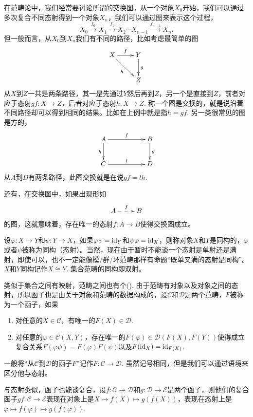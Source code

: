 \para 在范畴论中，我们经常要讨论所谓的交换图。从一个对象$X_0$开始，我们可以通过多次复合不同态射得到一个对象$X_n$，我们可以通过图来表示这个过程，
\[
	X_0\xrightarrow{f_0} X_1\xrightarrow{f_1} X_2\cdots X_{n-1}\xrightarrow{f_{n-1}} X_n.
\]
但一般而言，从$X_0$到$X_n$我们有不同的路径，比如考虑最简单的图
\[
\begin{xy}
	\xymatrix{
		X\ar[r]^{f} \ar[dr]_{h}&Y \ar[d]^{g}\\
		&Z
	}
\end{xy}
\]
从$X$到$Z$一共是两条路径，其一是先通过$Y$然后再到$Z$，另一个是直接到$Z$，前者对应于态射$gf:X\to Z$，后者对应于态射$h:X\to Z$. 称一个图是交换的，就是说沿着不同路径却可以得到相同的结果。比如在上例中就是指$h=gf$. 另一类很常见的图是方的，
\[
\begin{xy}
	\xymatrix{
		A\ar[rr]^{f} \ar[d]_{h}&&B \ar[d]^{g}\\
		C\ar[rr]^{l}&&D
	}
\end{xy}
\]
从$A$到$D$有两条路径，此图交换就是在说$gf=lh$. 

还有，在交换图中，如果出现形如
\[
\begin{xy}
	\xymatrix{
		A\ar@{-->}[r]^{f}&B
	}
\end{xy}
\]
的图，这就意味着，存在唯一的态射$f:A\to B$使得交换图成立。

\para 设$\varphi:X\to Y$和$\psi:Y\to X$，如果$\varphi\psi=\operatorname{id}_Y$和$\psi\varphi=\operatorname{id}_X$，则称对象$X$和$Y$是同构的，$\varphi$或者$\psi$被称为同构（态射）。当然，现在由于暂时不能谈一个态射是单射还是满射，即使可以，也不一定能像模/群/环范畴那样有命题“既单又满的态射是同构”。$X$和$Y$同构记作$X\cong Y$. 集合范畴的同构即双射。

\para 类似于集合之间有映射，范畴之间也有个(). 由于范畴有对象以及对象之间的态射，所以函子也是由关于对象和范畴的数据构成的，设$\mathcal{C}$和$\mathcal{D}$是两个范畴，$F$被称为一个函子，如果
\begin{enumerate}
	\item 对任意的$X\in \mathcal{C}$，有唯一的$F(X)\in \mathcal{D}$.
	
	\item 对任意的$\varphi\in \mathcal{C}(X,Y)$，存在唯一的$F(\varphi)\in  \mathcal{D}(F(X),F(Y))$使得成立复合关系$F(\varphi\psi)=F(\varphi)F(\psi)$以及$F(\operatorname{id}_X)=\operatorname{id}_{F(X)}$.
\end{enumerate}

一般将“从$\mathcal{C}$到$\mathcal{D}$的函子$F$”记作$F:\mathcal{C}\to \mathcal{D}$. 虽然记号相同，但是我们可以通过语境来区分他与态射。

与态射类似，函子也能谈复合，设$f:\mathcal{C}\to \mathcal{D}$和$g:\mathcal{D}\to \mathcal{E}$是两个函子，则他们的复合函子$gf:\mathcal{C}\to \mathcal{E}$表现在对象上是$X\mapsto f(X)\mapsto g(f(X))$，表现在态射上是$\varphi\mapsto f(\varphi)\mapsto g(f(\varphi))$. 

